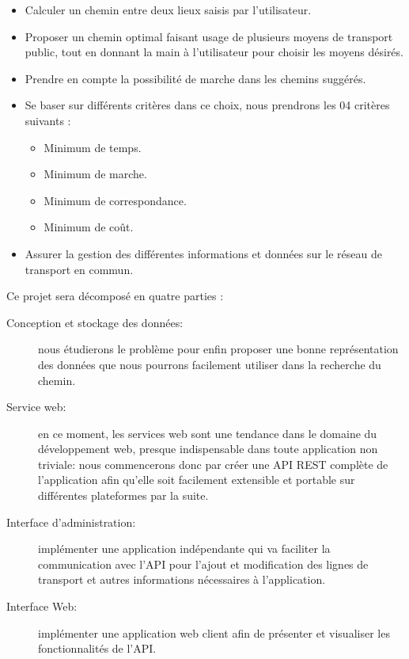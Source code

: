 \begin{itemize}
	\item Calculer un chemin entre deux lieux saisis par l'utilisateur.
	\item Proposer un chemin optimal faisant usage de plusieurs moyens de transport public, tout en donnant la main à l'utilisateur pour choisir les moyens désirés.
	\item Prendre en compte la possibilité de marche dans les chemins suggérés.
	\item Se baser sur différents critères dans ce choix, nous prendrons les 04 critères suivants : 
	\begin{itemize}
		\item Minimum de temps.
		\item Minimum de marche.
		\item Minimum de correspondance.
		\item Minimum de coût.
	\end{itemize}	 
	\item Assurer la gestion des différentes informations et données sur le réseau de transport en commun.\\
\end{itemize}
Ce projet sera décomposé en quatre parties :
\begin{description}
	\item[Conception et stockage des données:] nous étudierons le problème pour enfin proposer une bonne représentation des données que nous pourrons facilement utiliser dans la recherche du chemin.

	\item[Service web:] en ce moment, les services web sont une tendance dans le domaine du développement web, presque indispensable dans toute application non triviale: nous commencerons donc par créer une \acrshort{API} \acrshort{REST} complète de l'application afin qu'elle soit facilement extensible et portable sur différentes \glspl{plateforme} par la suite.
	
	\item[Interface d'administration:] implémenter une application indépendante qui va faciliter la  communication avec l'API pour l'ajout et modification des lignes de transport et autres informations nécessaires à l'application.
	
	
	\item[Interface Web:] implémenter une application web client afin de présenter et visualiser les fonctionnalités de l'API.
\end{description}

